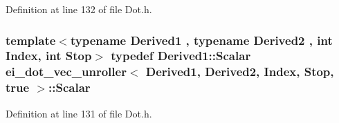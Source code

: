 Definition at line 132 of file Dot.\-h.

\hypertarget{structei__dot__vec__unroller_3_01_derived1_00_01_derived2_00_01_index_00_01_stop_00_01true_01_4_a1d80de60683b2fca00070f3f3ff204ab}{
\subsubsection[{Scalar}]{\setlength{\rightskip}{0pt plus 5cm}template$<$typename Derived1 , typename Derived2 , int Index, int Stop$>$ typedef Derived1\-::\-Scalar {\bf ei\-\_\-dot\-\_\-vec\-\_\-unroller}$<$ Derived1, Derived2, Index, Stop, true $>$\-::{\bf Scalar}}}\label{structei__dot__vec__unroller_3_01_derived1_00_01_derived2_00_01_index_00_01_stop_00_01true_01_4_a1d80de60683b2fca00070f3f3ff204ab}


Definition at line 131 of file Dot.\-h.



